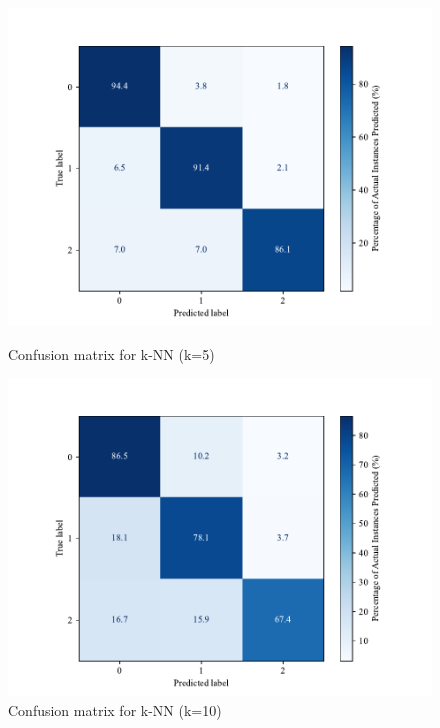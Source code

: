\begin{figure}[H]
    \centering
    \begin{minipage}[b]{0.45\textwidth}
        \centering
        \includegraphics[width=\textwidth]{images/confusion_matrix_knn5.pdf}
        \caption{Confusion matrix for k-NN (k=5)}
        \label{fig:confusion_knn_5}
    \end{minipage}
    \hfill
    \begin{minipage}[b]{0.45\textwidth}
        \centering
        \includegraphics[width=\textwidth]{images/confusion_matrix_knn10.pdf}
        \caption{Confusion matrix for k-NN (k=10)}
        \label{fig:confusion_knn_10}
    \end{minipage}
\end{figure}

